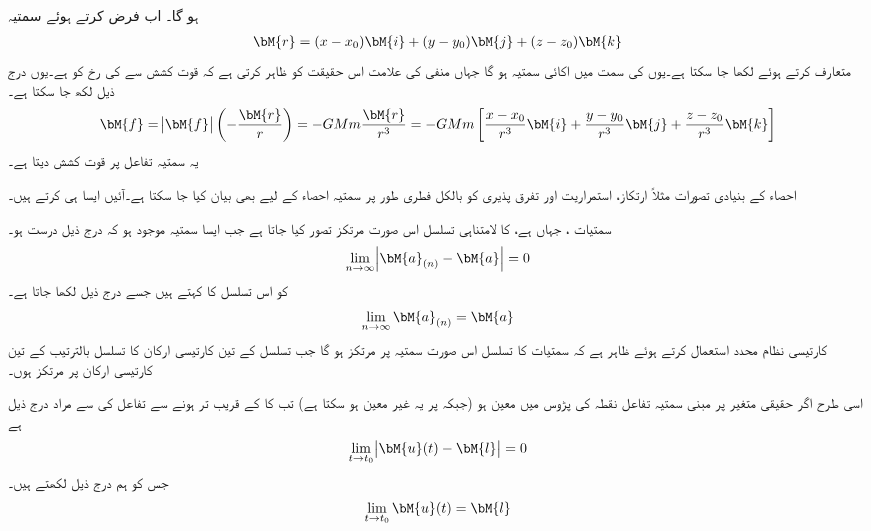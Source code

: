 ہو گا۔ اب  فرض کرتے ہوئے سمتیہ 
\begin{align}
\bM{r}=(x-x_0)\bM{i}+(y-y_0)\bM{j}+(z-z_0)\bM{k}
\end{align}
متعارف کرتے ہوئے  لکھا جا سکتا ہے۔یوں  کی سمت میں اکائی سمتیہ   ہو گا جہاں منفی کی علامت اس حقیقت کو ظاہر کرتی ہے کہ قوت کشش  سے  کی رخ کو  ہے۔یوں درج ذیل لکھ جا سکتا ہے۔
\begin{align}
\bM{f}=\abs{\bM{f}}\left(-\frac{\bM{r}}{r}\right)=-GMm\frac{\bM{r}}{r^3}=-GMm\left[\frac{x-x_0}{r^3}\bM{i}+\frac{y-y_0}{r^3}\bM{j}+\frac{z-z_0}{r^3}\bM{k}\right]
\end{align}
یہ سمتیہ  تفاعل  پر قوت کشش دیتا ہے۔

احصاء کے بنیادی تصورات  مثلاً ارتکاز، استمراریت اور تفرق پذیری کو  بالکل فطری طور پر سمتیہ احصاء کے لیے بھی  بیان کیا جا سکتا ہے۔آئیں ایسا ہی کرتے ہیں۔

سمتیات ، جہاں  ہے، کا لامتناہی تسلسل اس صورت مرتکز تصور کیا جاتا ہے جب ایسا سمتیہ  موجود ہو کہ درج ذیل درست ہو۔
\begin{align}
\lim_{n\to \infty} \abs{\bM{a}_{(n)}-\bM{a}}=0
\end{align}  
 کو اس تسلسل کا  کہتے ہیں جسے درج ذیل لکھا جاتا ہے۔
\begin{align}
\lim_{n\to \infty} \bM{a}_{(n)}=\bM{a}
\end{align}
کارتیسی نظام محدد استعمال کرتے ہوئے ظاہر ہے کہ سمتیات کا تسلسل اس صورت سمتیہ  پر مرتکز ہو گا جب تسلسل کے تین کارتیسی ارکان کا تسلسل بالترتیب  کے تین کارتیسی ارکان پر مرتکز ہوں۔

اسی طرح اگر حقیقی متغیر  پر مبنی سمتیہ  تفاعل  نقطہ  کی پڑوس میں معین ہو (جبکہ  پر یہ غیر معین ہو سکتا ہے) تب    کا  کے قریب تر ہونے سے تفاعل کی    سے مراد درج ذیل ہے
\begin{align}
\lim_{t\to t_0} \abs{\bM{u}(t)-\bM{l}}=0
\end{align}  
جس کو ہم درج ذیل لکھتے ہیں۔
\begin{align}
\lim_{t\to t_0} \bM{u}(t)=\bM{l}
\end{align}


